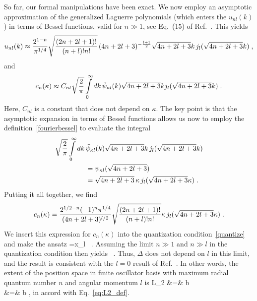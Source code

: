 	So far, our formal manipulations have been exact.  We now employ an
	asymptotic approximation of the generalized Laguerre polynomials
	(which enters the $u_{nl}(k)$) in terms of Bessel functions, valid for
	$n\gg 1$, see Eq.~(15) of Ref.~\cite{Deano2013}.  This yields
	\begin{align}
	u_{nl}(k) \approx {2^{1-n}\over \pi^{1/4}} \sqrt{(2n+2l+1)!\over (n+l)! n!}
	   \,(4n+2l+3)^{-{l+1\over 2}}
	   \sqrt{4n+2l+3} k\, j_l(\sqrt{4n+2l+3}k) \;,
	\end{align}
	and
	\begin{align}
	c_n(\kappa) \approx C_{nl} \sqrt{2\over \pi}\int\limits_0^\infty dk \,
	\tilde{\psi}_{\kappa l}(k)	\sqrt{4n+2l+3} k
	 j_l(\sqrt{4n+2l+3}k) \;.
	\end{align}
	Here, $C_{nl}$ is a constant that does not depend on $\kappa$.  The key
	point is that the asymptotic expansion in terms of Bessel functions
	allows us now to employ the definition~\eqref{fourierbessel} to
	evaluate the integral
	\begin{align}
	 \sqrt{2\over \pi}\int\limits_0^\infty dk\, & \tilde{\psi}_{\kappa l}(k)
	\sqrt{4n+2l+3} k\, j_l(\sqrt{4n+2l+3}k) \nonumber \\
	&=  \psi_{\kappa l}(\sqrt{4n+2l+3}) \nonumber \\
	&= \sqrt{4n+2l+3}\, \kappa\, j_l(\sqrt{4n+2l+3}\kappa) \;.
	\end{align}
	Putting it all together, we find
	\begin{align}
	c_n(\kappa) = {2^{1/2-n}(-1)^n \pi^{1/4} \over (4n+2l+3)^{l/2}}
	\sqrt{(2n+2l+1)!\over (n+l)!n!}
	\kappa\, j_l(\sqrt{4n+2l+3}\kappa) \;.
	\end{align}
	We insert this expression for $c_n(\kappa)$ into the quantization
	condition~\eqref{quantize} and make the ansatz
	\beq
	\kappa ={x_l\over{}} \ .
	\eeq
	Assuming the limit $n\gg 1$ and $n\gg l$ in the quantization condition
	then yields
	\beq
	 \ .
	\eeq
	Thus, $\Delta$ does not depend on $l$ in this limit, and the result
	is consistent with the $l=0$ result of Ref.~\cite{More:2013rma}. In
	other words, the extent of the position space in finite oscillator
	basis with maximum radial quantum number $n$ and angular momentum $l$ is
	\bea
	\label{L2}
	  L_2 &=& b \nonumber\\
	&=& b \;,
	\eea
	in accord with Eq.~\eqref{eq:L2_def}.

